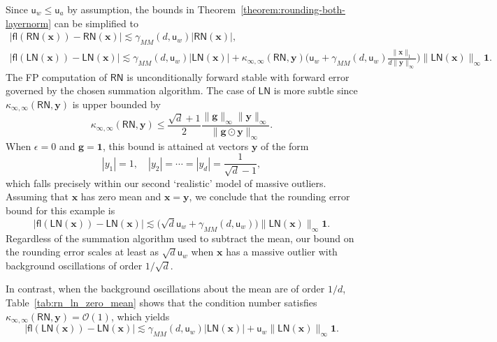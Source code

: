 \documentclass[namedate,webpdf,imanum]{ima-authoring-template}
\newcommand{\Matrix}[1]{\mathbf{#1}}
\newcommand{\Norm}[3][]{#1\| #2 #1\|_{\mathrm{#3}}}
\newcommand{\hap}{\mathbin{\odot}}
\newcommand{\One}{\Matrix{1}}
\newcommand{\Layer}[1]{\mathsf{#1}}
\newcommand{\cond}[3][]{\kappa_{\mathrm{#2}} #1( #3 #1)}
\newcommand{\fl}[2][]{\mathsf{fl}#1( #2 #1)}
\newcommand{\uh}{\mathsf{u}}
\newcommand{\Oh}[2][]{\mathcal{O}#1( #2 #1)}
\numberwithin{equation}{section}
\begin{document}
Since $\uh_w \leq \uh_a$ by assumption, the bounds in Theorem~\ref{theorem:rounding-both-layernorm} can be simplified to
\begin{gather*}
    | \fl{\Layer{RN}(\Matrix{x})} - \Layer{RN}(\Matrix{x}) | \lesssim \gamma_{MM}(d,\uh_w) |\Layer{RN}(\Matrix{x})|, \\
    | \fl{\Layer{LN}(\Matrix{x})} - \Layer{LN}(\Matrix{x}) | \lesssim \gamma_{MM}(d,\uh_w) |\Layer{LN}(\Matrix{x})| + \cond{\infty,\infty}{\Layer{RN},\Matrix{y}} \bigg( \uh_{w} + \gamma_{MM}(d,\uh_w) \frac{\Norm{\Matrix{x}}{1}}{d \Norm{\Matrix{y}}{\infty}} \bigg) \Norm{\Layer{LN}(\Matrix{x})}{\infty} \One.
\end{gather*}
The FP computation of $\Layer{RN}$ is unconditionally forward stable with forward error governed by the chosen summation algorithm.
The case of $\Layer{LN}$ is more subtle since $\cond{\infty,\infty}{\Layer{RN},\Matrix{y}}$ is upper bounded by
\begin{equation}
\label{eq:cond-rn-universal-bound}
    \cond{\infty,\infty}{\Layer{RN},\Matrix{y}} \leq \frac{\sqrt{d} + 1}{2} \frac{\Norm{\Matrix{g}}{\infty} \Norm{\Matrix{y}}{\infty}}{\Norm{\Matrix{g} \hap \Matrix{y}}{\infty}}.
\end{equation}
When $\epsilon = 0$ and $\Matrix{g} = \One$, this bound is attained at vectors $\Matrix{y}$ of the form
\begin{equation*}
    |y_1| = 1, \quad |y_2| = \cdots = |y_d| = \frac{1}{\sqrt{d} - 1},
\end{equation*}
which falls precisely within our second `realistic' model of massive outliers.
Assuming that $\Matrix{x}$ has zero mean and $\Matrix{x} = \Matrix{y}$, we conclude that the rounding error bound for this example is
\begin{equation*}
    | \fl{\Layer{LN}(\Matrix{x})} - \Layer{LN}(\Matrix{x}) | \lesssim \Big( \sqrt{d} \uh_{w} + \gamma_{MM}(d,\uh_w) \Big) \Norm{\Layer{LN}(\Matrix{x})}{\infty} \One.
\end{equation*}
Regardless of the summation algorithm used to subtract the mean, our bound on the rounding error scales at least as $\sqrt{d} \uh_{w}$ when $\Matrix{x}$ has a massive outlier with background oscillations of order $1 / \sqrt{d}$.

In contrast, when the background oscillations about the mean are of order $1 / d$, Table~\ref{tab:rn_ln_zero_mean} shows that the condition number satisfies $\cond{\infty,\infty}{\Layer{RN},\Matrix{y}} = \Oh{1}$, which yields
\begin{equation*}
    | \fl{\Layer{LN}(\Matrix{x})} - \Layer{LN}(\Matrix{x}) | \lesssim \gamma_{MM}(d,\uh_w) |\Layer{LN}(\Matrix{x})| + \uh_{w} \Norm{\Layer{LN}(\Matrix{x})}{\infty} \One.
\end{equation*}
\end{document}
